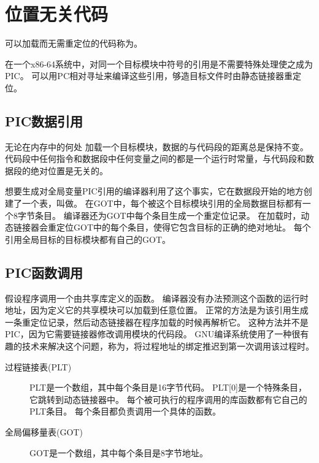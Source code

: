 
\section{位置无关代码}
{
    可以加载而无需重定位的代码称为。

    在一个x86-64系统中，对同一个目标模块中符号的引用是不需要特殊处理使之成为PIC。
    可以用PC相对寻址来编译这些引用，够造目标文件时由静态链接器重定位。

    \subsection{PIC数据引用}
    {
        无论在内存中的何处 加载一个目标模块，数据的与代码段的距离总是保持不变。
        代码段中任何指令和数据段中任何变量之间的都是一个运行时常量，与代码段和数据段的绝对位置是无关的。

        想要生成对全局变量PIC引用的编译器利用了这个事实，它在数据段开始的地方创建了一个表，叫做。
        在GOT中，每个被这个目标模块引用的全局数据目标都有一个8字节条目。
        编译器还为GOT中每个条目生成一个重定位记录。
        在加载时，动态链接器会重定位GOT中的每个条目，使得它包含目标的正确的绝对地址。
        每个引用全局目标的目标模块都有自己的GOT。
    }

    \subsection{PIC函数调用}
    {
        假设程序调用一个由共享库定义的函数。
        编译器没有办法预测这个函数的运行时地址，因为定义它的共享模块可以加载到任意位置。
        正常的方法是为该引用生成一条重定位记录，然后动态链接器在程序加载的时候再解析它。
        这种方法并不是PIC，因为它需要链接器修改调用模块的代码段。
        GNU编译系统使用了一种很有趣的技术来解决这个问题，称为，将过程地址的绑定推迟到第一次调用该过程时。

        \begin{description}
            \item[过程链接表(PLT)]
            {
                PLT是一个数组，其中每个条目是16字节代码。
                PLT[0]是一个特殊条目，它跳转到动态链接器中。
                每个被可执行的程序调用的库函数都有它自己的PLT条目。
                每个条目都负责调用一个具体的函数。
            }
            \item[全局偏移量表(GOT)]
            {
                GOT是一个数组，其中每个条目是8字节地址。
            }
        \end{description}

}}
